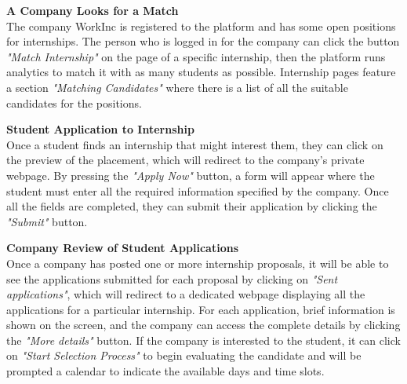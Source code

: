 {\begin{enumerate}[label=\textbf{[\arabic*]}, left = 0 pt, align = left]
            \item \textbf{A Company Looks for a Match}   
            \\The company WorkInc is registered to the platform and has some open positions for internships. The person who is logged in for the company can click the button \textit{"Match Internship"} on the page of a specific internship, then the platform runs analytics to match it with as many students as possible. Internship pages feature a section \textit{"Matching Candidates"} where there is a list of all the suitable candidates for the positions.
            
            \item \textbf{Student Application to Internship}                      
            \\Once a student finds an internship that might interest them, they can click on the preview of the placement, which will redirect to the company's private webpage. By pressing the \textit{"Apply Now"} button, a form will appear where the student must enter all the required information specified by the company. Once all the fields are completed, they can submit their application by clicking the \textit{"Submit"} button.
            
            \item \textbf{Company Review of Student Applications}           %
            \\Once a company has posted one or more internship proposals, it will be able to see the applications submitted for each proposal by clicking on \textit{"Sent applications"}, which will redirect to a dedicated webpage displaying all the applications for a particular internship. For each application, brief information is shown on the screen, and the company can access the complete details by clicking the \textit{"More details"} button. If the company is interested to the student, it can click on \textit{"Start Selection Process"} to begin evaluating the candidate and will be prompted a calendar to indicate the available days and time slots.
            

\end{enumerate}}
